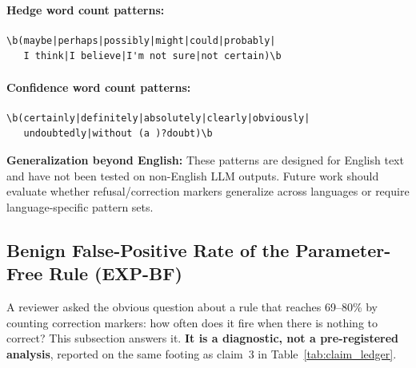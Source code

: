 \paragraph{Hedge word count patterns:}
\begin{scriptsize}
\begin{verbatim}
\b(maybe|perhaps|possibly|might|could|probably|
   I think|I believe|I'm not sure|not certain)\b
\end{verbatim}
\end{scriptsize}

\paragraph{Confidence word count patterns:}
\begin{scriptsize}
\begin{verbatim}
\b(certainly|definitely|absolutely|clearly|obviously|
   undoubtedly|without (a )?doubt)\b
\end{verbatim}
\end{scriptsize}

\textbf{Generalization beyond English:} These patterns are designed for English text and have not been tested on non-English LLM outputs. Future work should evaluate whether refusal/correction markers generalize across languages or require language-specific pattern sets.

\subsection{Benign False-Positive Rate of the Parameter-Free Rule (EXP-BF)}
\label{app:benign_fpr}

A reviewer asked the obvious question about a rule that reaches 69--80\% by counting correction markers: how often does it fire when there is nothing to correct? This subsection answers it. \textbf{It is a diagnostic, not a pre-registered analysis}, reported on the same footing as claim~3 in Table~\ref{tab:claim_ledger}.

